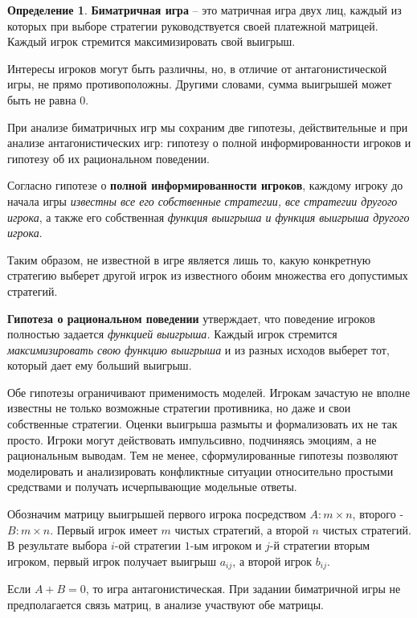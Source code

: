 \documentclass[aps,%
12pt,%
final,%
oneside,
onecolumn,%
musixtex, %
superscriptaddress,%
centertags]{article} %
\theoremstyle{plain}
\theoremstyle{definition}
\newtheorem{definition}{Определение}[subsection]
\theoremstyle{remark}
\begin{document}
\begin{definition}
  \textbf{Биматричная игра} – это матричная игра двух лиц, каждый из которых при выборе стратегии руководствуется своей платежной матрицей. Каждый игрок стремится максимизировать свой выигрыш. 

  Интересы игроков могут быть различны, но, в отличие от антагонистической игры, не прямо противоположны. Другими словами, сумма выигрышей может быть не равна $0$.
\end{definition}

При анализе биматричных игр мы сохраним две гипотезы, действительные и при анализе антагонистических игр: гипотезу о полной информированности игроков и гипотезу об их рациональном поведении.

Согласно гипотезе о \textbf{полной информированности игроков}, каждому игроку до начала игры
\textit{известны все его собственные стратегии, все стратегии другого игрока}, а также его собственная
\textit{функция выигрыша и функция выигрыша другого игрока}. 

Таким образом, не известной в игре
является лишь то, какую конкретную стратегию выберет другой игрок из известного обоим
множества его допустимых стратегий.

\textbf{Гипотеза о рациональном поведении} утверждает, что поведение игроков полностью задается
\textit{функцией выигрыша.} Каждый игрок стремится \textit{максимизировать свою функцию выигрыша} и из
разных исходов выберет тот, который дает ему больший выигрыш.

Обе гипотезы ограничивают применимость моделей. Игрокам зачастую не вполне известны не только возможные стратегии противника, но даже и свои собственные стратегии. Оценки выигрыша размыты и формализовать их не так просто. Игроки могут действовать импульсивно, подчиняясь эмоциям, а не рациональным выводам. Тем не менее, сформулированные гипотезы
позволяют моделировать и анализировать конфликтные ситуации относительно простыми средствами и получать исчерпывающие модельные ответы.

Обозначим матрицу выигрышей первого игрока посредством $A: m \times n$, второго - $B: m \times n$. Первый игрок имеет $m$ чистых стратегий, а второй $n$ чистых стратегий. В результате выбора $i$-ой стратегии $1$-ым игроком и $j$-й стратегии вторым игроком, первый игрок получает выигрыш $a_{ij}$, а второй игрок $b_{ij}$.

Если $A+B=0$, то игра антагонистическая. При задании биматричной игры не предполагается связь матриц, в анализе участвуют обе матрицы.
\end{document}
